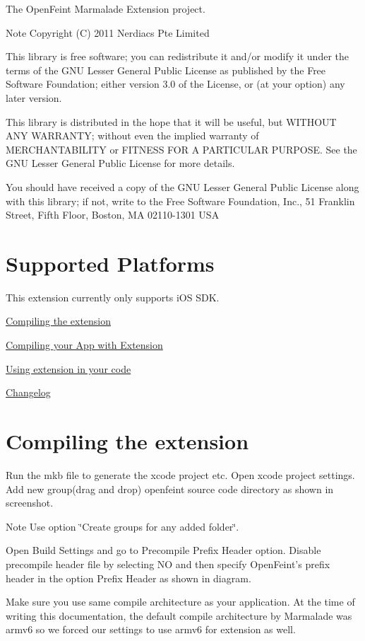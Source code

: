 The OpenFeint Marmalade Extension project. \begin{DoxyNote}{Note}
Copyright (C) 2011 Nerdiacs Pte Limited

This library is free software; you can redistribute it and/or modify it under the terms of the GNU Lesser General Public License as published by the Free Software Foundation; either version 3.0 of the License, or (at your option) any later version.

This library is distributed in the hope that it will be useful, but WITHOUT ANY WARRANTY; without even the implied warranty of MERCHANTABILITY or FITNESS FOR A PARTICULAR PURPOSE. See the GNU Lesser General Public License for more details.

You should have received a copy of the GNU Lesser General Public License along with this library; if not, write to the Free Software Foundation, Inc., 51 Franklin Street, Fifth Floor, Boston, MA 02110-\/1301 USA
\end{DoxyNote}
\hypertarget{index_sec_1}{}\section{Supported Platforms}\label{index_sec_1}
This extension currently only supports iOS SDK.

\hyperlink{index_sec_2}{Compiling the extension}

\hyperlink{index_sec_3}{Compiling your App with Extension}

\hyperlink{index_sec_4}{Using extension in your code}

\hyperlink{index_sec_5}{Changelog}\hypertarget{index_sec_2}{}\section{Compiling the extension}\label{index_sec_2}
Run the mkb file to generate the xcode project etc. Open xcode project settings. Add new group(drag and drop) openfeint source code directory as shown in screenshot. \begin{DoxyNote}{Note}
Use option \char`\"{}Create groups for any added folder\char`\"{}.
\end{DoxyNote}
 Open Build Settings and go to Precompile Prefix Header option. Disable precompile header file by selecting NO and then specify OpenFeint's prefix header in the option Prefix Header as shown in diagram.



Make sure you use same compile architecture as your application. At the time of writing this documentation, the default compile architecture by Marmalade was armv6 so we forced our settings to use armv6 for extension as well.




